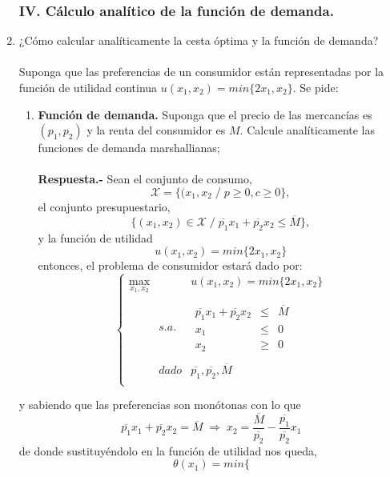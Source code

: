 \begin{enumerate}
\subsubsection*{\center IV. Cálculo analítico de la función de demanda.}
\vspace{.5cm}

    \item ¿Cómo calcular analíticamente la cesta óptima y la función de demanda?\\\\
	Suponga que las preferencias de un consumidor están representadas por la función de utilidad continua $u(x_1, x_2) = min\lbrace2x_1, x_2\rbrace$. Se pide:

	\begin{enumerate}[\bfseries a)]

	    \item \textbf{Función de demanda.} Suponga que el precio de las mercancías es $(p_1, p_2)$ y la renta del consumidor es $M$. Calcule analíticamente las funciones de demanda marshallianas;\\\\
		\textbf{Respuesta.-}\; Sean el conjunto de consumo, $$\mathcal{X} = \lbrace (x_1,x_2 \; / \; p \geq 0, c\geq 0 \rbrace,$$
		el conjunto presupuestario, $$\lbrace(x_1,x_2)\in \mathcal{X} \; / \; \overline{p_1}x_1 + \overline{p_2} x_2 \leq \overline{M}\rbrace,$$
		y la función de utilidad $$u(x_1,x_2) = min\lbrace2x_1,x_2\rbrace$$
		entonces, el problema de consumidor estará dado por:
		$$\left\{\begin{array}{ccc}
			\max\limits_{x_1,x_2}&&u(x_1,x_2)=min\lbrace2x_1,x_2\rbrace\\\\
					     &s.a.&\begin{array}{rcl} \overline{p_1}x_1 + \overline{p_2}x_2&\leq &\overline{M}\\ x_1&\leq&0\\ x_2&\geq & 0 \end{array}\\\\
			   &dado&\overline{p_1},\overline{p_2},\overline{M}\\
		\end{array}\right.$$

	\end{enumerate}

	y sabiendo que las preferencias son monótonas con lo que $$\overline{p_1}x_1+\overline{p_2}x_2=\overline{M}\; \Longrightarrow \; x_2 = \dfrac{\overline{M}}{\overline{p_2}}-\dfrac{\overline{p_1}}{\overline{p_2}}x_1$$ de donde sustituyéndolo en la función de utilidad nos queda,
	$$\theta(x_1) = min\lbrace$$


\end{enumerate}
